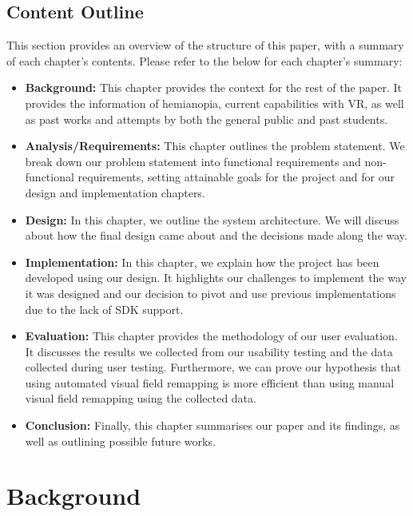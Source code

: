 \documentclass{l4proj}
\begin{document}
\section{Content Outline}
This section provides an overview of the structure of this paper, with a summary of each chapter's contents.
Please refer to the below for each chapter's summary:
\begin{itemize}    
    \item
      \textbf{Background:} This chapter provides the context for the rest of the paper. It provides the information of hemianopia, current capabilities with VR, as well as past works and attempts by both the general public and past students.
    \item
      \textbf{Analysis/Requirements:} This chapter outlines the problem statement. We break down our problem statement into functional requirements and non-functional requirements, setting attainable goals for the project and for our design and implementation chapters.
    \item
      \textbf{Design: } In this chapter, we outline the system architecture. We will discuss about how the final design came about and the decisions made along the way.
    \item
      \textbf{Implementation:} In this chapter, we explain how the project has been developed using our design. It highlights our challenges to implement the way it was designed and our decision to pivot and use previous implementations due to the lack of SDK support.
    \item
      \textbf{Evaluation:} This chapter provides the methodology of our user evaluation. It discusses the results we collected from our usability testing and the data collected during user testing. Furthermore, we can prove our hypothesis that using automated visual field remapping is more efficient than using manual visual field remapping using the collected data.
    \item
      \textbf{Conclusion:} Finally, this chapter summarises our paper and its findings, as well as outlining possible future works.
\end{itemize}



\chapter{Background}
\end{document}
